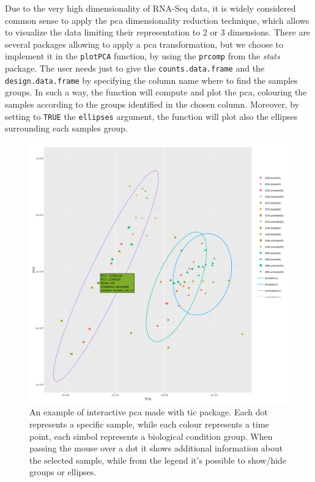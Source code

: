 Due to the very high dimensionality of RNA-Seq data, it is widely considered common sense to apply the \gls{pca} dimensionality reduction technique, which allows to visualize the data limiting their representation to 2 or 3 dimensions.
There are several packages allowing to apply a \gls{pca} transformation, but we choose to implement it in the \lstinline!plotPCA! function, by using the \lstinline!prcomp! from the \textit{stats} package.
The user needs just to give the \lstinline!counts.data.frame! and the \lstinline!design.data.frame! by specifying the column name where to find the samples groups.
In such a way, the function will compute and plot the pca, colouring the samples according to the groups identified in the chosen column.
Moreover, by setting to \lstinline!TRUE! the \lstinline!ellipses! argument, the function will plot also the ellipses surrounding each samples group.


\begin{figure}[H]
\includegraphics[width=\textwidth,height=\textheight,keepaspectratio]{img/ticorser/pca_example.png}
\caption[ticorser pca]{An example of interactive \gls{pca} made with \gls{tic} package. Each dot represents a specific sample, while each colour represents a time point, each simbol represents a biological condition group. When passing the mouse over a dot it shows additional information about the selected sample, while from the legend it's possible to show/hide groups or ellipses.}
\label{fig:ticorserpca}
\centering
\end{figure}

